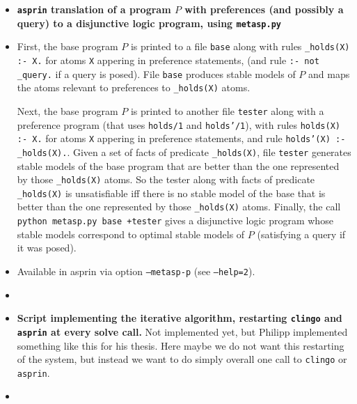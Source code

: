 \documentclass[a4paper,10pt]{article}
\begin{document}
\begin{itemize}
\item
\textbf{\texttt{asprin} translation of a program $P$ with preferences (and possibly a query) to a disjunctive logic program, 
using \texttt{metasp.py}}
\item
First, the base program $P$ is printed to a file \texttt{base} 
along with rules \texttt{\_holds(X) :- X.} for atoms \texttt{X} appering in preference statements, 
(and rule \texttt{:- not \_query.} if a query is posed).
File \texttt{base} produces stable models of $P$ and maps the atoms relevant to preferences to \texttt{\_holds(X)} atoms.

Next, the base program $P$ is printed to another file \texttt{tester}
along with a preference program (that uses \texttt{holds/1} and \texttt{holds'/1}),
with rules \texttt{holds(X) :- X.} for atoms \texttt{X} appering in preference statements,
and rule \texttt{holds'(X) :- \_holds(X).}.
Given a set of facts of predicate \texttt{\_holds(X)}, 
file \texttt{tester} generates stable models of the base program that are better than the one 
represented by those \texttt{\_holds(X)} atoms.
So the tester along with facts of predicate \texttt{\_holds(X)} is unsatisfiable 
iff there is no stable model of the base that is better than the one 
represented by those \texttt{\_holds(X)} atoms.
Finally, the call \texttt{python metasp.py base +tester} gives a disjunctive logic program 
whose stable models correspond to optimal stable models of $P$ (satisfying a query if it was posed).
\item
Available in asprin via option \texttt{--metasp-p} (see \texttt{--help=2}).
\item
 

\item
\textbf{Script implementing the iterative algorithm, restarting \texttt{clingo} and \texttt{asprin} at every solve call.}
Not implemented yet, but Philipp implemented something like this for his thesis.
Here maybe we do not want this restarting of the system, 
but instead we want to do simply overall one call to \texttt{clingo} or \texttt{asprin}.

\item


\end{itemize}
\end{document}
